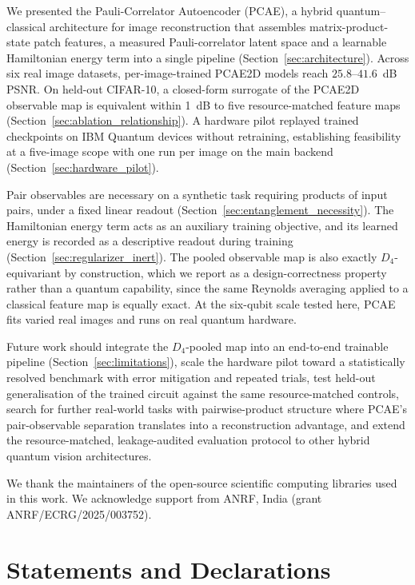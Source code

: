 \documentclass[pdflatex,sn-basic]{sn-jnl}
\begin{document}
We presented the Pauli-Correlator Autoencoder (PCAE), a hybrid quantum--classical architecture for image reconstruction that assembles matrix-product-state patch features, a measured Pauli-correlator latent space and a learnable Hamiltonian energy term into a single pipeline (Section~\ref{sec:architecture}).
Across six real image datasets, per-image-trained PCAE2D models reach $25.8$--$41.6$~dB PSNR.
On held-out CIFAR-10, a closed-form surrogate of the PCAE2D observable map is equivalent within 1~dB to five resource-matched feature maps (Section~\ref{sec:ablation_relationship}).
A hardware pilot replayed trained checkpoints on IBM Quantum devices without retraining, establishing feasibility at a five-image scope with one run per image on the main backend (Section~\ref{sec:hardware_pilot}).

Pair observables are necessary on a synthetic task requiring products of input pairs, under a fixed linear readout (Section~\ref{sec:entanglement_necessity}).
The Hamiltonian energy term acts as an auxiliary training objective, and its learned energy is recorded as a descriptive readout during training (Section~\ref{sec:regularizer_inert}).
The pooled observable map is also exactly $D_4$-equivariant by construction, which we report as a design-correctness property rather than a quantum capability, since the same Reynolds averaging applied to a classical feature map is equally exact.
At the six-qubit scale tested here, PCAE fits varied real images and runs on real quantum hardware.

Future work should integrate the $D_4$-pooled map into an end-to-end trainable pipeline (Section~\ref{sec:limitations}), scale the hardware pilot toward a statistically resolved benchmark with error mitigation and repeated trials, test held-out generalisation of the trained circuit against the same resource-matched controls, search for further real-world tasks with pairwise-product structure where PCAE's pair-observable separation translates into a reconstruction advantage, and extend the resource-matched, leakage-audited evaluation protocol to other hybrid quantum vision architectures.

\backmatter


We thank the maintainers of the open-source scientific computing libraries used in this work.
We acknowledge support from ANRF, India (grant ANRF/ECRG/2025/003752).

\section*{Statements and Declarations}
\end{document}
